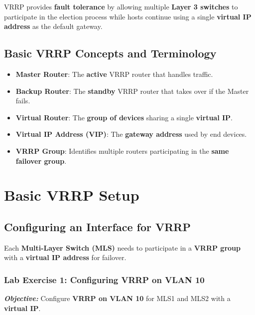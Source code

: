 \documentclass[a4paper]{book}
\begin{document}
VRRP provides \textbf{fault tolerance} by allowing multiple \textbf{Layer 3 switches} to participate 
in the election process while hosts continue using a single \textbf{virtual IP address} as the 
default gateway.



\vspace{1.5em}

\subsection{Basic VRRP Concepts and Terminology}
\begin{itemize}
\item \textbf{Master Router}: The \textbf{active} VRRP router that handles traffic.
\item \textbf{Backup Router}: The \textbf{standby} VRRP router that takes over if the Master fails.
\item \textbf{Virtual Router}: The \textbf{group of devices} sharing a single \textbf{virtual IP}.
\item \textbf{Virtual IP Address (VIP)}: The \textbf{gateway address} used by end devices.
\item \textbf{VRRP Group}: Identifies multiple routers participating in the \textbf{same failover group}.
\end{itemize}


\vspace{1.5em}

\section{Basic VRRP Setup}

\subsection{Configuring an Interface for VRRP}
Each \textbf{Multi-Layer Switch (MLS)} needs to participate in a \textbf{VRRP group} with a 
\textbf{virtual IP address} for failover.

\subsubsection{Lab Exercise 1: Configuring VRRP on VLAN 10}
\textbf{\textit{Objective:}} Configure \textbf{VRRP on VLAN 10} for MLS1 and MLS2 with a 
\textbf{virtual IP}.
\vspace{1.5em}
\end{document}
